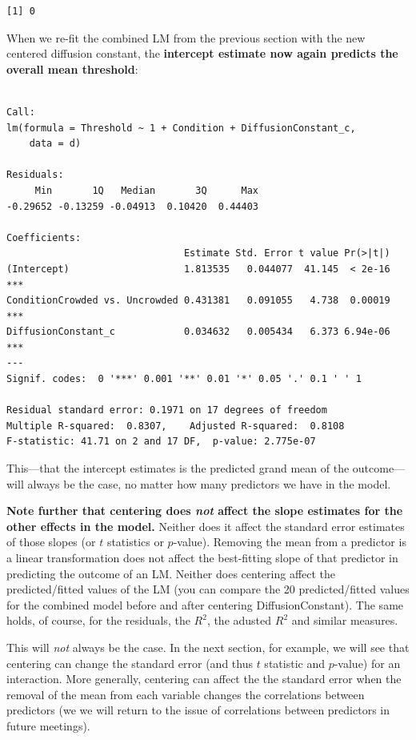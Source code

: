 \documentclass[
]{article}
\begin{document}
\begin{verbatim}
[1] 0
\end{verbatim}

\normalsize

When we re-fit the combined LM from the previous section with the new
centered diffusion constant, the \textbf{intercept estimate now again
predicts the overall mean threshold}:

\footnotesize

\begin{verbatim}

Call:
lm(formula = Threshold ~ 1 + Condition + DiffusionConstant_c, 
    data = d)

Residuals:
     Min       1Q   Median       3Q      Max 
-0.29652 -0.13259 -0.04913  0.10420  0.44403 

Coefficients:
                               Estimate Std. Error t value Pr(>|t|)    
(Intercept)                    1.813535   0.044077  41.145  < 2e-16 ***
ConditionCrowded vs. Uncrowded 0.431381   0.091055   4.738  0.00019 ***
DiffusionConstant_c            0.034632   0.005434   6.373 6.94e-06 ***
---
Signif. codes:  0 '***' 0.001 '**' 0.01 '*' 0.05 '.' 0.1 ' ' 1

Residual standard error: 0.1971 on 17 degrees of freedom
Multiple R-squared:  0.8307,    Adjusted R-squared:  0.8108 
F-statistic: 41.71 on 2 and 17 DF,  p-value: 2.775e-07
\end{verbatim}

\normalsize

This---that the intercept estimates is the predicted grand mean of the
outcome---will always be the case, no matter how many predictors we have
in the model.

\textbf{Note further that centering does \emph{not} affect the slope
estimates for the other effects in the model.} Neither does it affect
the standard error estimates of those slopes (or \(t\) statistics or
\(p\)-value). Removing the mean from a predictor is a linear
transformation does not affect the best-fitting slope of that predictor
in predicting the outcome of an LM. Neither does centering affect the
predicted/fitted values of the LM (you can compare the 20
predicted/fitted values for the combined model before and after
centering DiffusionConstant). The same holds, of course, for the
residuals, the \(R^2\), the adusted \(R^2\) and similar measures.

This will \emph{not} always be the case. In the next section, for
example, we will see that centering can change the standard error (and
thus \(t\) statistic and \(p\)-value) for an interaction. More
generally, centering can affect the the standard error when the removal
of the mean from each variable changes the correlations between
predictors (we we will return to the issue of correlations between
predictors in future meetings).
\end{document}
